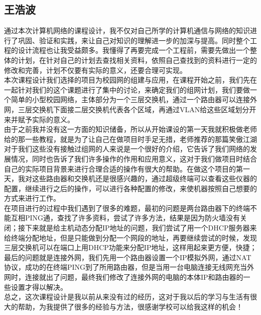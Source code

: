 	\subsection*{王浩波}
    通过本次计算机网络的课程设计，我不仅对自己所学的计算机通信与网络的知识进行了巩固、验证和实践，来让自己对知识的理解进一步的加深与提高。同时整个工程的设计流程也让我受益颇多。我懂得了再要完成一个工程前，需要先做出一个整体的计划，在针对自己的计划去查找相关资料，依照自己查找到的资料进行一定的修改和完善，计划不仅要有实际的意义，还要合理可实现。\\
\indent    本次课程设计我们选择的项目为校园网的组建与应用，在课程开始之前，我们先在一起针对我们的这个课题进行了集中的讨论，来确定我们的组网计划，我们要做一个简单的小型校园网络，主体部分为一个三层交换机，通过一个路由器可以连接外网，三层交换机下面接二层交换机代表各个区域，再通过VLAN给这些区域划分开来并赋予实际的意义。\\
\indent 由于之前我并没有这一方面的知识储备，所以从开始课设的第一天我就积极做老师给的那一些教程，就是为了让自己在做项目时手足无措，老师推荐的那篇笑傲江湖对于我们这些没有接触过组网的人来说是一个很好的介绍，它告诉了我们网络的发展情况，同时也告诉了我们许多操作的作用和应用意义，这对于我们做项目时结合自己的实际项目背景来进行合理合适的操作有很大的帮助。在做这个项目的第一天，我对这些路由器和交换机还是很感兴趣的，通过超级终端可以查看这些仪器的配置，继续进行之后的操作，可以进行各种配置的修改，来使机器按照自己想要的方式来进行工作。\\
\indent    在项目进行的过程中我们遇到了很多的难题，最初的问题是两台路由器下的终端不能互相PING通，查找了许多资料，尝试了许多方法，结果是因为防火墙没有关闭；接下来就是给主机动态分配IP地址的问题，我们尝试了用一个DHCP服务器来给终端分配地址，但是只能做到分配一个网段的地址，再要继续尝试的时候，发现三层交换机可以在端口上用DHCP功能来分配IP地址，这样用起来更方便，快捷；最后的问题就是连接外网，我们先用一个路由器设置一个IP模拟外网，通过NAT协议，成功的在终端PING到了所用路由器，但是当用一台电脑连接无线网充当外网时，连接就出了问题，最终我们修改了连接外网的电脑的本体IP和路由器的一些设置才得以解决。\\
\indent    总之，这次课程设计是我以前从来没有过的经历，这对于我以后的学习与生活有很大的帮助，为我提供了很多的经验与方法，很感谢学校可以给我这样的机会！
